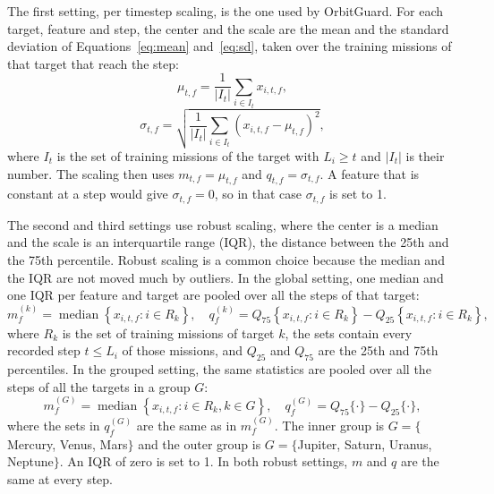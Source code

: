 The first setting, per timestep scaling, is the one used by OrbitGuard. For each target, feature and step, the center and the scale are the mean and the standard deviation of Equations~\ref{eq:mean} and~\ref{eq:sd}, taken over the training missions of that target that reach the step:
\begin{equation}
\mu_{t,f} = \frac{1}{\lvert I_t \rvert} \sum_{i \in I_t}{x_{i,t,f}},
\label{eq:mean}
\end{equation}
\begin{equation}
\sigma_{t,f} = \sqrt{ \frac{1}{\lvert I_t \rvert} \sum_{i \in I_t}{ \left( x_{i,t,f} - \mu_{t,f} \right)^2 } },
\label{eq:sd}
\end{equation}
where $I_t$ is the set of training missions of the target with $L_i \ge t$ and $\lvert I_t \rvert$ is their number. The scaling then uses $m_{t,f} = \mu_{t,f}$ and $q_{t,f} = \sigma_{t,f}$. A feature that is constant at a step would give $\sigma_{t,f} = 0$, so in that case $\sigma_{t,f}$ is set to 1.

The second and third settings use robust scaling, where the center is a median and the scale is an interquartile range (IQR), the distance between the 25th and the 75th percentile. Robust scaling is a common choice because the median and the IQR are not moved much by outliers. In the global setting, one median and one IQR per feature and target are pooled over all the steps of that target:
\begin{equation}
m_{f}^{(k)} = \operatorname{median} \left\{ x_{i,t,f} : i \in R_k \right\}, \quad q_{f}^{(k)} = Q_{75} \left\{ x_{i,t,f} : i \in R_k \right\} - Q_{25} \left\{ x_{i,t,f} : i \in R_k \right\},
\label{eq:global}
\end{equation}
where $R_k$ is the set of training missions of target $k$, the sets contain every recorded step $t \le L_i$ of those missions, and $Q_{25}$ and $Q_{75}$ are the 25th and 75th percentiles. In the grouped setting, the same statistics are pooled over all the steps of all the targets in a group $G$:
\begin{equation}
m_{f}^{(G)} = \operatorname{median} \left\{ x_{i,t,f} : i \in R_k, k \in G \right\}, \quad q_{f}^{(G)} = Q_{75} \{ \cdot \} - Q_{25} \{ \cdot \},
\label{eq:grouped}
\end{equation}
where the sets in $q_f^{(G)}$ are the same as in $m_f^{(G)}$. The inner group is $G = \{$Mercury, Venus, Mars$\}$ and the outer group is $G = \{$Jupiter, Saturn, Uranus, Neptune$\}$. An IQR of zero is set to 1. In both robust settings, $m$ and $q$ are the same at every step.

